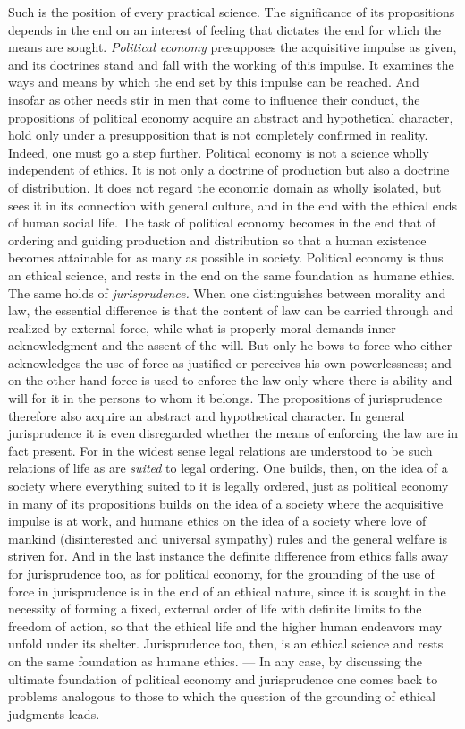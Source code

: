 \documentclass[12pt,a4paper,openany]{book}
\newcommand{\opage}[1]{\marginnote{\footnotesize\textit{[#1]}}}
\begin{document}
Such is the position of every practical science. The significance of its propositions depends in
the end on an interest of feeling that dictates the end for which the means are sought.
\textit{Political economy} presupposes the acquisitive impulse as given, and its doctrines stand and
fall with the working of this impulse. It examines the ways and means by which the end set by this
impulse can be reached. And insofar as other needs stir in men that come to influence their conduct,
the propositions of political economy acquire an abstract and hypothetical character, hold only under
a presupposition that is not completely confirmed in reality. Indeed, one must go a step further.
Political economy is not a science wholly independent of ethics. It is not only a doctrine of
production but also a doctrine of distribution. It does not regard the economic domain as wholly
isolated, but sees it in its connection with general culture, and in the end with the ethical ends of
human social life. The task of political economy becomes in the end that of ordering and guiding
production and distribution so that a human existence becomes attainable for as many as possible in
society. Political economy is thus an ethical science, and rests in the end on the same foundation as
humane ethics. The same holds of \textit{jurisprudence.} When one distinguishes between morality and
law, the essential difference is that the content of law can be carried through and realized by
external force, while what is properly moral demands inner acknowledgment and the assent of the will.
But only he bows to force who either acknowledges the use of force as justified or perceives his own
powerlessness; and on the other hand force is used to enforce the law only where there is ability and
will for it in the persons to whom it belongs. The propositions of jurisprudence therefore also
acquire an abstract and hypothetical character.
\opage{53}In general jurisprudence it is even disregarded whether the means of enforcing the law are in fact
present. For in the widest sense legal relations are understood to be such relations of life as are
\textit{suited} to legal ordering. One builds, then, on the idea of a society where everything suited
to it is legally ordered, just as political economy in many of its propositions builds on the idea of
a society where the acquisitive impulse is at work, and humane ethics on the idea of a society where
love of mankind (disinterested and universal sympathy) rules and the general welfare is striven for.
And in the last instance the definite difference from ethics falls away for jurisprudence too, as for
political economy, for the grounding of the use of force in jurisprudence is in the end of an ethical
nature, since it is sought in the necessity of forming a fixed, external order of life with definite
limits to the freedom of action, so that the ethical life and the higher human endeavors may unfold
under its shelter. Jurisprudence too, then, is an ethical science and rests on the same foundation as
humane ethics. --- In any case, by discussing the ultimate foundation of political economy and
jurisprudence one comes back to problems analogous to those to which the question of the grounding of
ethical judgments leads.
\end{document}
